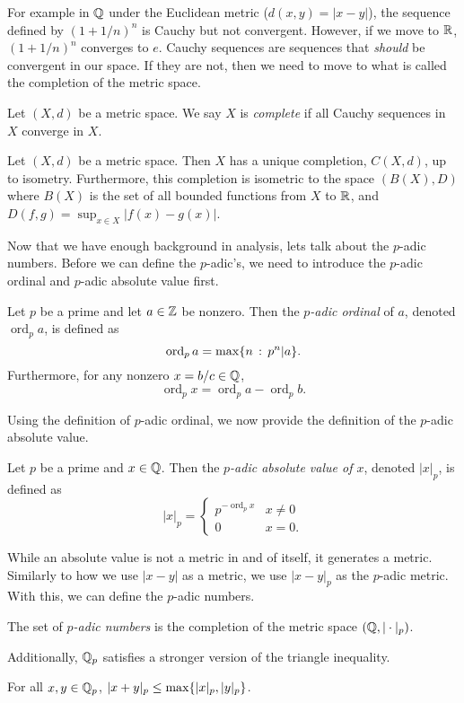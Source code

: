 \documentclass[notitlepage]{problem-solving}
\def\ord{\operatorname{ord}}
\begin{document}
For example in $\mathbb{Q}$ under the Euclidean metric ($d(x,y)=|x-y|$), the sequence defined by $(1+1/n)^n$ is Cauchy but not convergent.
However, if we move to $\mathbb{R}$, $(1+1/n)^n$ converges to $e$.
Cauchy sequences are sequences that \textit{should} be convergent in our space.
If they are not, then we need to move to what is called the completion of the metric space.
\begin{definition}
	Let $(X,d)$ be a metric space.
	We say $X$ is \textit{complete} if all Cauchy sequences in $X$ converge in $X$.
\end{definition}
\begin{thm}
	Let $(X,d)$ be a metric space.
	Then $X$ has a unique completion, $C(X,d)$, up to isometry.
	Furthermore, this completion is isometric to the space $(B(X),D)$ where $B(X)$ is the set of all bounded functions from $X$ to $\mathbb{R}$, and $D(f,g)=\sup_{x\in X} |f(x)-g(x)|$.
\end{thm}

Now that we have enough background in analysis, lets talk about the $p$-adic numbers.
Before we can define the $p$-adic's, we need to introduce the $p$-adic ordinal and $p$-adic absolute value first.
\begin{definition}
	Let $p$ be a prime and let $a\in\mathbb{Z}$ be nonzero.
	Then the \textit{$p$-adic ordinal} of $a$, denoted $\ord_p a$, is defined as
	\[
		\ord_p a = \max\set{n\,:\, p^n | a}.
	\]
	Furthermore, for any nonzero $x=b/c\in\mathbb{Q}$,
	\[
		\ord_p x = \ord_p a - \ord_p b.
	\]
\end{definition}
Using the definition of $p$-adic ordinal, we now provide the definition of the $p$-adic absolute value.
\begin{definition}
	Let $p$ be a prime and $x\in\mathbb{Q}$.
	Then the \textit{$p$-adic absolute value of $x$}, denoted $|x|_p$, is defined as
	\[
		|x|_p =
		\begin{cases}
			p^{-\ord_p x} & x\neq 0\\
			0 & x=0.
		\end{cases}
	\]
\end{definition}
While an absolute value is not a metric in and of itself, it generates a metric.
Similarly to how we use $|x-y|$ as a metric, we use $|x-y|_p$ as the $p$-adic metric.
With this, we can define the $p$-adic numbers.
\begin{definition}
	The set of \textit{$p$-adic numbers} is the completion of the metric space $(\mathbb{Q},|\cdot|_p)$.
\end{definition}
Additionally, $\mathbb{Q}_p$ satisfies a stronger version of the triangle inequality.
\begin{thm}
	For all $x,y\in\mathbb{Q}_p$, $|x+y|_p\leq\max\lbrace |x|_p,|y|_p \rbrace$.
\end{thm}
\end{document}
